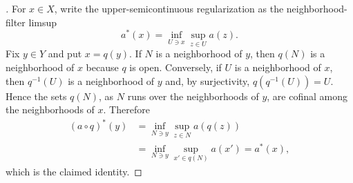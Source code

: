 
\begin{proof}[]
For $x\in X$, write the upper-semicontinuous regularization as the
neighborhood-filter limsup
\[
                  a^*(x)=\inf_{U\ni x}\sup_{z\in U}a(z).
\]
Fix $y\in Y$ and put $x=q(y)$.  If $N$ is a neighborhood of $y$,
then $q(N)$ is a neighborhood of $x$ because $q$ is open.
Conversely, if $U$ is a neighborhood of $x$, then $q^{-1}(U)$ is a
neighborhood of $y$ and, by surjectivity, $q(q^{-1}(U))=U$.  Hence the
sets $q(N)$, as $N$ runs over the neighborhoods of $y$, are cofinal
among the neighborhoods of $x$.  Therefore
\[
 \begin{split}
 (a\circ q)^*(y)
   &=\inf_{N\ni y}\sup_{z\in N}a(q(z))\\
   &=\inf_{N\ni y}\sup_{x'\in q(N)}a(x')
    =a^*(x),
 \end{split}
\]
which is the claimed identity.
\end{proof}

